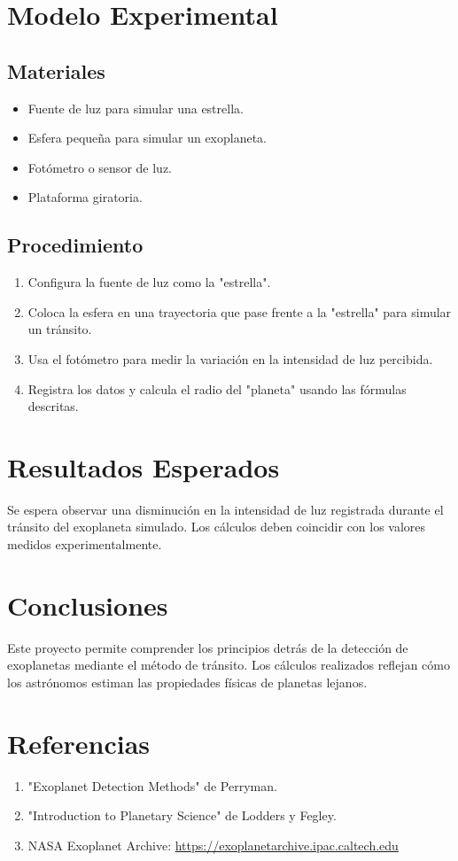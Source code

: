 \documentclass[12pt]{article}
\begin{document}
\section{Modelo Experimental}
\subsection{Materiales}
\begin{itemize}
    \item Fuente de luz para simular una estrella.
    \item Esfera pequeña para simular un exoplaneta.
    \item Fotómetro o sensor de luz.
    \item Plataforma giratoria.
\end{itemize}

\subsection{Procedimiento}
\begin{enumerate}
    \item Configura la fuente de luz como la "estrella".
    \item Coloca la esfera en una trayectoria que pase frente a la "estrella" para simular un tránsito.
    \item Usa el fotómetro para medir la variación en la intensidad de luz percibida.
    \item Registra los datos y calcula el radio del "planeta" usando las fórmulas descritas.
\end{enumerate}

\section{Resultados Esperados}
Se espera observar una disminución en la intensidad de luz registrada durante el tránsito del exoplaneta simulado. Los cálculos deben coincidir con los valores medidos experimentalmente.

\section{Conclusiones}
Este proyecto permite comprender los principios detrás de la detección de exoplanetas mediante el método de tránsito. Los cálculos realizados reflejan cómo los astrónomos estiman las propiedades físicas de planetas lejanos.

\section{Referencias}
\begin{enumerate}
    \item "Exoplanet Detection Methods" de Perryman.
    \item "Introduction to Planetary Science" de Lodders y Fegley.
    \item NASA Exoplanet Archive: \url{https://exoplanetarchive.ipac.caltech.edu}
\end{enumerate}
\end{document}
